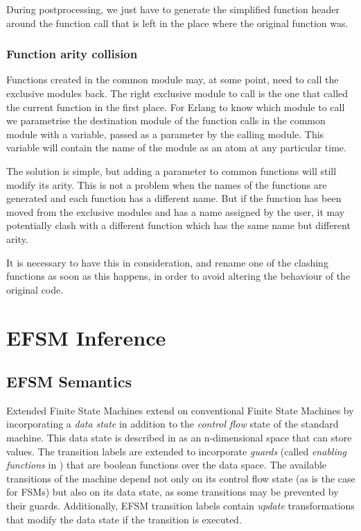 During postprocessing, we just have to generate the simplified function
header around the function call that is left in the place where the
original function was.


\subsubsection{Function arity collision\label{sub:function-arity-collision}}

Functions created in the common module may, at some point, need to
call the exclusive modules back. The right exclusive module to call
is the one that called the current function in the first place. For
Erlang to know which module to call we parametrise the destination
module of the function calls in the common module with a variable,
passed as a parameter by the calling module. This variable will contain
the name of the module as an atom at any particular time.

The solution is simple, but adding a parameter to common functions
will still modify its arity. This is not a problem when the names
of the functions are generated and each function has a different name.
But if the function has been moved from the exclusive modules and
has a name assigned by the user, it may potentially clash with a different
function which has the same name but different arity.

It is necessary to have this in consideration, and rename one of the
clashing functions as soon as this happens, in order to avoid altering
the behaviour of the original code.

\section{EFSM Inference}
\label{EFSMInference}

\subsection{EFSM Semantics}
\label{EFSMSemantics}

Extended Finite State Machines extend on conventional Finite State Machines by incorporating a \emph{data state} in addition to the \emph{control flow} state of the standard machine. This data state is described in \cite{EFSMs} as an n-dimensional space that can store values. The transition labels are extended to incorporate \emph{guards} (called \emph{enabling functions} in \cite{EFSMs}) that are boolean functions over the data space. The available transitions of the machine depend not only on its control flow state (as is the case for FSMs) but also on its data state, as some transitions may be prevented by their guards. Additionally, EFSM transition labels contain \emph{update} transformations that modify the data state if the transition is executed. 

